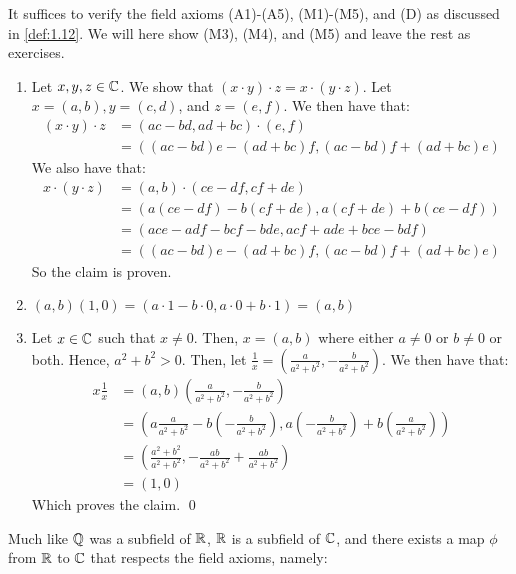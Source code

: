 \begin{nproof}
    It suffices to verify the field axioms (A1)-(A5), (M1)-(M5), and (D) as discussed in \ref{def:1.12}. We will here show (M3), (M4), and (M5) and leave the rest as exercises. 
    \begin{enumerate}[start=3, label={(M\arabic*):}]
    \item Let $x, y, z \in \mathbb{C}$. We show that $(x\cdot y)\cdot z = x \cdot (y \cdot z)$. Let $x = (a, b), y = (c, d)$, and $z = (e, f)$. We then have that:
    \begin{align*}
        (x\cdot y) \cdot z &= (ac - bd, ad + bc) \cdot (e, f)
        \\ &= ((ac-bd)e - (ad+bc)f, (ac-bd)f + (ad+bc)e)
    \end{align*}
    We also have that:
    \begin{align*}
        x \cdot(y\cdot z) &= (a, b)\cdot(ce - df, cf + de)
        \\ &= (a(ce-df) - b(cf+de), a(cf+de) + b(ce-df))
        \\ &= (ace - adf - bcf - bde, acf + ade + bce - bdf)
        \\ &= ((ac-bd)e - (ad+bc)f, (ac-bd)f + (ad+bc)e)
    \end{align*}
    So the claim is proven.
    \item $(a, b)(1, 0) = (a \cdot 1 - b \cdot 0, a \cdot 0 + b \cdot 1) = (a, b)$
    \item Let $x \in \mathbb{C}$ such that $x \neq 0$. Then, $x = (a, b)$ where either $a \neq 0$ or $b \neq 0$ or both. Hence, $a^2 + b^2 > 0$. Then, let $\frac{1}{x} = (\frac{a}{a^2 + b^2}, -\frac{b}{a^2+b^2})$. We then have that:
    \begin{align*}
        x\frac{1}{x} &= (a, b)\left(\frac{a}{a^2 + b^2}, -\frac{b}{a^2+b^2}\right)
        \\ &= \left(a\frac{a}{a^2 + b^2} - b\left(-\frac{b}{a^2+b^2}\right), a\left(-\frac{b}{a^2+b^2}\right) + b\left(\frac{a}{a^2+b^2}\right)\right)
        \\ &= \left(\frac{a^2 +b^2}{a^2 + b^2}, -\frac{ab}{a^2+b^2} + \frac{ab}{a^2+b^2}\right)
        \\ &= (1, 0)
    \end{align*}
    Which proves the claim. \qed
    \end{enumerate}
\end{nproof}
\noindent Much like $\mathbb{Q}$ was a subfield of $\mathbb{R}$, $\mathbb{R}$ is a subfield of $\mathbb{C}$, and there exists a map $\phi$ from $\mathbb{R}$ to $\mathbb{C}$ that respects the field axioms, namely:
